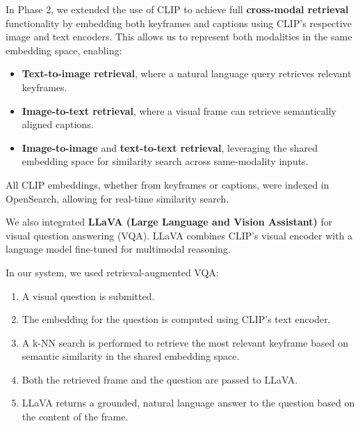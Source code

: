 \documentclass[runningheads]{llncs}
\begin{document}
In Phase 2, we extended the use of CLIP to achieve full \textbf{cross-modal retrieval} functionality by embedding both keyframes and captions using CLIP’s respective image and text encoders. This allows us to represent both modalities in the same embedding space, enabling:

\begin{itemize}
    \item \textbf{Text-to-image retrieval}, where a natural language query retrieves relevant keyframes.

    \item \textbf{Image-to-text retrieval}, where a visual frame can retrieve semantically aligned captions.

    \item \textbf{Image-to-image} and \textbf{text-to-text retrieval}, leveraging the shared embedding space for similarity search across same-modality inputs.
\end{itemize}

All CLIP embeddings, whether from keyframes or captions, were indexed in OpenSearch, allowing for real-time similarity search.

We also integrated \textbf{LLaVA (Large Language and Vision Assistant)} for visual question answering (VQA). LLaVA combines CLIP’s visual encoder with a language model fine-tuned for multimodal reasoning.

In our system, we used retrieval-augmented VQA:

\begin{enumerate}
    \item A visual question is submitted.

    \item The embedding for the question is computed using CLIP's text encoder.

    \item A k-NN search is performed to retrieve the most relevant keyframe based on semantic similarity in the shared embedding space.

    \item Both the retrieved frame and the question are passed to LLaVA.

    \item LLaVA returns a grounded, natural language answer to the question based on the content of the frame.
\end{enumerate}

\vspace{2\baselineskip plus 0.5\baselineskip minus 0.5\baselineskip} %
\end{document}
